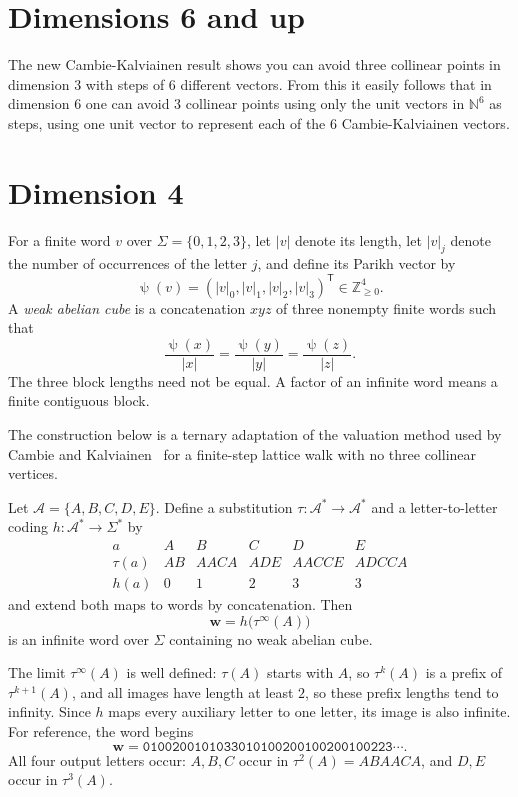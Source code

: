 \documentclass[12pt,reqno]{article}
\newcommand{\Z}{\mathbb Z}
\newcommand{\N}{\mathbb N}
\newcommand{\word}[1]{\mathtt{#1}}
\newcommand{\ww}{\mathbf{w}}
\DeclareMathOperator{\Par}{\psi}
\begin{document}
\section{Dimensions 6 and up}

The new Cambie-Kalviainen result shows you can avoid three collinear points in dimension 3 with steps of 6 different vectors.  From this it easily follows that in dimension 6 one can avoid 3 collinear points using only the unit vectors in $\N^6$ as steps, using one unit vector to represent each of the 6 Cambie-Kalviainen  vectors.



\section{Dimension 4}
\label{dim4}

For a finite word
$v$ over $\Sigma=\{0,1,2,3\}$, let $|v|$ denote its length, let $|v|_j$
denote the number of occurrences of the letter $j$, and define its Parikh
vector by
\[
  \Par(v)=(|v|_0,|v|_1,|v|_2,|v|_3)^{\mathsf T}\in\Z_{\geq0}^{4}.
\]
A \emph{weak abelian cube} is a concatenation $xyz$ of three nonempty
finite words such that
\[
  \frac{\Par(x)}{|x|}
  =\frac{\Par(y)}{|y|}
  =\frac{\Par(z)}{|z|}.
\]
The three block lengths need not be equal. A factor of an infinite word
means a finite contiguous block.

The construction below is a ternary adaptation of the valuation method
used by Cambie and Kalviainen~\cite{CK} for a finite-step lattice walk
with no three collinear vertices.

\begin{theorem}\label{thm:main}
Let $\mathcal A=\{A,B,C,D,E\}$. Define a substitution
$\tau:\mathcal A^*\to\mathcal A^*$ and a letter-to-letter coding
$h:\mathcal A^*\to\Sigma^*$ by
\[
\begin{array}{c|ccccc}
a&A&B&C&D&E\\ \hline
\tau(a)&AB&AACA&ADE&AACCE&ADCCA\\
h(a)&0&1&2&3&3
\end{array}
\]
and extend both maps to words by concatenation. Then
\[
  \ww=h\bigl(\tau^\infty(A)\bigr)
\]
is an infinite word over $\Sigma$ containing no weak abelian cube.
\end{theorem}

The limit $\tau^\infty(A)$ is well defined: $\tau(A)$ starts with $A$,
so $\tau^k(A)$ is a prefix of $\tau^{k+1}(A)$, and all images have
length at least $2$, so these prefix lengths tend to infinity. Since $h$
maps every auxiliary letter to one letter, its image is also infinite.
For reference, the word begins
\[
  \ww=\word{0100200101033010100200100200100223}\cdots.
\]
All four output letters occur: $A,B,C$ occur in $\tau^2(A)=ABAACA$,
and $D,E$ occur in $\tau^3(A)$.
\end{document}
